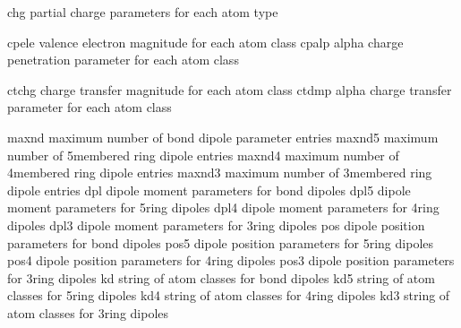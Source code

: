 \documentclass[letterpaper,11pt,english]{sphinxmanual}
\begin{document}

\begin{sphinxVerbatim}[commandchars=\\\{\}]
chg             partial charge parameters for each atom type
\end{sphinxVerbatim}


\begin{sphinxVerbatim}[commandchars=\\\{\}]
cpele           valence electron magnitude for each atom class
cpalp           alpha charge penetration parameter for each atom class
\end{sphinxVerbatim}


\begin{sphinxVerbatim}[commandchars=\\\{\}]
ctchg           charge transfer magnitude for each atom class
ctdmp           alpha charge transfer parameter for each atom class
\end{sphinxVerbatim}


\begin{sphinxVerbatim}[commandchars=\\\{\}]
maxnd           maximum number of bond dipole parameter entries
maxnd5          maximum number of 5\PYGZhy{}membered ring dipole entries
maxnd4          maximum number of 4\PYGZhy{}membered ring dipole entries
maxnd3          maximum number of 3\PYGZhy{}membered ring dipole entries
dpl             dipole moment parameters for bond dipoles
dpl5            dipole moment parameters for 5\PYGZhy{}ring dipoles
dpl4            dipole moment parameters for 4\PYGZhy{}ring dipoles
dpl3            dipole moment parameters for 3\PYGZhy{}ring dipoles
pos             dipole position parameters for bond dipoles
pos5            dipole position parameters for 5\PYGZhy{}ring dipoles
pos4            dipole position parameters for 4\PYGZhy{}ring dipoles
pos3            dipole position parameters for 3\PYGZhy{}ring dipoles
kd              string of atom classes for bond dipoles
kd5             string of atom classes for 5\PYGZhy{}ring dipoles
kd4             string of atom classes for 4\PYGZhy{}ring dipoles
kd3             string of atom classes for 3\PYGZhy{}ring dipoles
\end{sphinxVerbatim}
\end{document}
